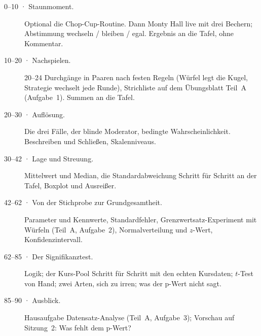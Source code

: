 \begin{ablauf}
\begin{description}
\item[0--10 · Staunmoment.] Optional die Chop-Cup-Routine. Dann
  Monty Hall live mit drei Bechern; Abstimmung wechseln / bleiben / egal.
  Ergebnis an die Tafel, ohne Kommentar.
\item[10--20 · Nachspielen.] 20--24 Durchgänge in Paaren nach festen
  Regeln (Würfel legt die Kugel, Strategie wechselt jede Runde),
  Strichliste auf dem Übungsblatt Teil~A (Aufgabe~1). Summen an die
  Tafel.
\item[20--30 · Auflösung.] Die drei Fälle, der blinde Moderator, bedingte
  Wahrscheinlichkeit. Beschreiben und Schließen, Skalenniveaus.
\item[30--42 · Lage und Streuung.] Mittelwert und Median, die
  Standardabweichung Schritt für Schritt an der Tafel, Boxplot und
  Ausreißer.
\item[42--62 · Von der Stichprobe zur Grundgesamtheit.] Parameter und
  Kennwerte, Standardfehler, Grenzwertsatz-Experiment mit Würfeln
  (Teil~A, Aufgabe~2), Normalverteilung und $z$-Wert,
  Konfidenzintervall.
\item[62--85 · Der Signifikanztest.] Logik; der Kurs-Pool Schritt für
  Schritt mit den echten Kursdaten; $t$-Test von Hand; zwei Arten, sich
  zu irren; was der p-Wert nicht sagt.
\item[85--90 · Ausblick.] Hausaufgabe Datensatz-Analyse (Teil~A,
  Aufgabe~3); Vorschau auf Sitzung~2: Was fehlt dem p-Wert?
\end{description}
\end{ablauf}

